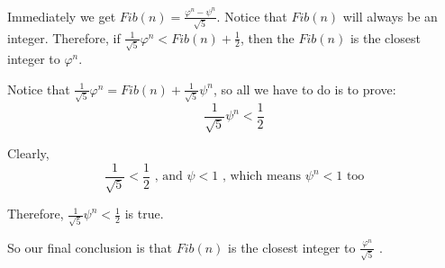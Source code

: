 \documentclass[utf-8]{article}
\begin{document}
Immediately we get $Fib(n)=\frac{\varphi^n-\psi^n}{\sqrt{5}}$.
Notice that $Fib(n)$ will always be an integer.
Therefore, if $\frac{1}{\sqrt{5}}\varphi^n < Fib(n)+ \frac{1}{2}$, then the $Fib(n)$ is
the closest integer to $\varphi^n$.

Notice that
$\frac{1}{\sqrt{5}}\varphi^n=Fib(n)+\frac{1}{\sqrt{5}}\psi^n$, so all
we have to do is to prove:
$$\frac{1}{\sqrt{5}}\psi^n < \frac{1}{2} $$

Clearly,
\[
  \frac{1}{\sqrt{5}} < \frac{1}{2} \mbox{ , and }
  \psi < 1 \mbox{ , which means } \psi^n < 1 \mbox{ too}
\]

Therefore, $\frac{1}{\sqrt{5}}\psi^n < \frac{1}{2}$ is true.

So our final conclusion is that $Fib(n)$ is the closest integer to $\frac{\varphi^n}{\sqrt{5}}$ .
\end{document}
